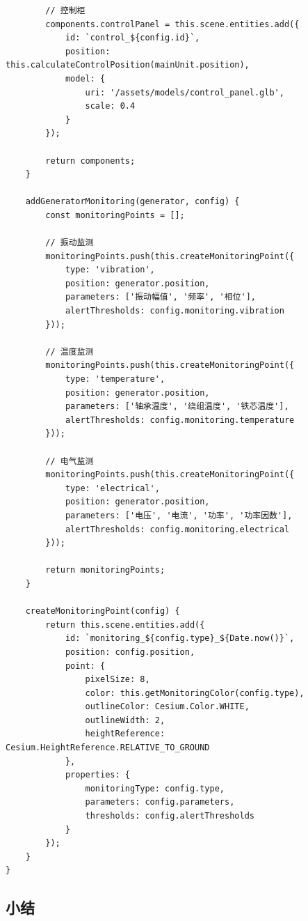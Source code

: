 \begin{lstlisting}
        // 控制柜
        components.controlPanel = this.scene.entities.add({
            id: `control_${config.id}`,
            position: this.calculateControlPosition(mainUnit.position),
            model: {
                uri: '/assets/models/control_panel.glb',
                scale: 0.4
            }
        });
        
        return components;
    }
    
    addGeneratorMonitoring(generator, config) {
        const monitoringPoints = [];
        
        // 振动监测
        monitoringPoints.push(this.createMonitoringPoint({
            type: 'vibration',
            position: generator.position,
            parameters: ['振动幅值', '频率', '相位'],
            alertThresholds: config.monitoring.vibration
        }));
        
        // 温度监测
        monitoringPoints.push(this.createMonitoringPoint({
            type: 'temperature',
            position: generator.position,
            parameters: ['轴承温度', '绕组温度', '铁芯温度'],
            alertThresholds: config.monitoring.temperature
        }));
        
        // 电气监测
        monitoringPoints.push(this.createMonitoringPoint({
            type: 'electrical',
            position: generator.position,
            parameters: ['电压', '电流', '功率', '功率因数'],
            alertThresholds: config.monitoring.electrical
        }));
        
        return monitoringPoints;
    }
    
    createMonitoringPoint(config) {
        return this.scene.entities.add({
            id: `monitoring_${config.type}_${Date.now()}`,
            position: config.position,
            point: {
                pixelSize: 8,
                color: this.getMonitoringColor(config.type),
                outlineColor: Cesium.Color.WHITE,
                outlineWidth: 2,
                heightReference: Cesium.HeightReference.RELATIVE_TO_GROUND
            },
            properties: {
                monitoringType: config.type,
                parameters: config.parameters,
                thresholds: config.alertThresholds
            }
        });
    }
}
\end{lstlisting}

\subsection{小结}\label{ux5c0fux7ed3}


